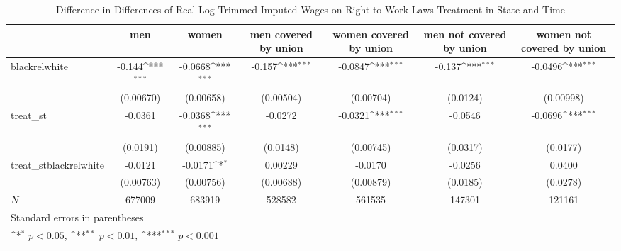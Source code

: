 \begin{table}[htbp]\centering
\def\sym#1{\ifmmode^{#1}\else\(^{#1}\)\fi}
\caption{Difference in Differences of Real Log Trimmed Imputed Wages on Right to Work Laws Treatment in State and Time}
\begin{tabular}{l*{6}{c}}
\hline\hline
            &\multicolumn{1}{c}{men}&\multicolumn{1}{c}{women}&\multicolumn{1}{c}{men covered by union}&\multicolumn{1}{c}{women covered by union}&\multicolumn{1}{c}{men not covered by union}&\multicolumn{1}{c}{women not covered by union}\\
\hline
blackrelwhite&      -0.144\sym{***}&     -0.0668\sym{***}&      -0.157\sym{***}&     -0.0847\sym{***}&      -0.137\sym{***}&     -0.0496\sym{***}\\
            &   (0.00670)         &   (0.00658)         &   (0.00504)         &   (0.00704)         &    (0.0124)         &   (0.00998)         \\
[1em]
treat\_st    &     -0.0361         &     -0.0368\sym{***}&     -0.0272         &     -0.0321\sym{***}&     -0.0546         &     -0.0696\sym{***}\\
            &    (0.0191)         &   (0.00885)         &    (0.0148)         &   (0.00745)         &    (0.0317)         &    (0.0177)         \\
[1em]
treat\_stblackrelwhite&     -0.0121         &     -0.0171\sym{*}  &     0.00229         &     -0.0170         &     -0.0256         &      0.0400         \\
            &   (0.00763)         &   (0.00756)         &   (0.00688)         &   (0.00879)         &    (0.0185)         &    (0.0278)         \\
\hline
\(N\)       &      677009         &      683919         &      528582         &      561535         &      147301         &      121161         \\
\hline\hline
\multicolumn{7}{l}{\footnotesize Standard errors in parentheses}\\
\multicolumn{7}{l}{\footnotesize \sym{*} \(p<0.05\), \sym{**} \(p<0.01\), \sym{***} \(p<0.001\)}\\
\end{tabular}
\end{table}
